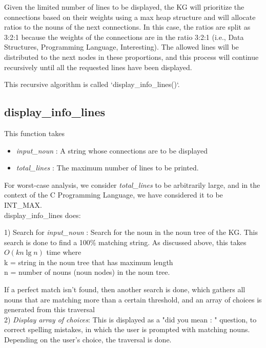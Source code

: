 \documentclass[conference]{IEEEtran}
\begin{document}
Given the limited number of lines to be displayed, the KG will prioritize the connections based on their weights using a max heap structure and will allocate ratios to the nouns of the next connections. In this case, the ratios are split as 
3:2:1 
because the weights of the connections are in the ratio 3:2:1 (i.e., Data Structures, Programming Language, Interesting). The allowed lines will be distributed to the next nodes in these proportions, and this process will continue recursively until all the requested lines have been displayed.

This recursive algorithm is called `display\_info\_lines()`.



\subsection{\textbf{display\_info\_lines}}

This function takes
\begin{itemize}
\item \textit{input\_noun} : A string whose connections are to be displayed
\item \textit{total\_lines} : The maximum number of lines to be printed. 
\end{itemize}
For worst-case analysis, we consider \textit{total\_lines} to be arbitrarily large, and in the context of the C Programming Language, we have considered it to be INT\_MAX.
\\

display\_info\_lines does:

1) Search for \textit{input\_noun} : Search for the noun in the noun tree of the KG. This search is done to find a 100\% matching string. As discussed above, this takes  $O(kn \lg n)$  time where 
\\k = string in the noun tree that has maximum length
\\n = number of nouns (noun nodes) in the noun tree.

If a perfect match isn't found, then another search is done, which gathers all nouns that are matching more than a certain threshold, and an array of choices is generated from this traversal
\\
2) \textit{Display array of choices}: This is displayed as a "did you mean : " question, to correct spelling mistakes, in which the user is prompted with matching nouns. Depending on the user’s choice, the traversal is done.\\
\end{document}
